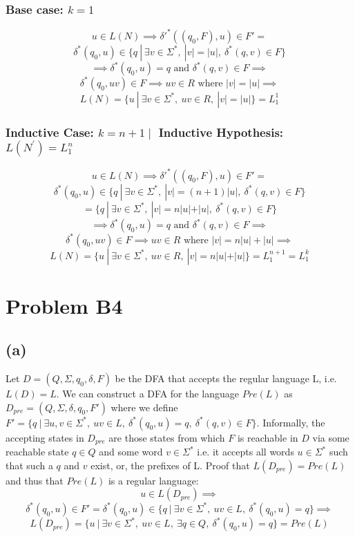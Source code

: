 \documentclass[12pt]{article}
\begin{document}
 \subsubsection*{ Base case: $k=1$}
  $$ u \in L(N) \implies \delta{'}^*((q_0, F), u) \in F' = $$
  $$ \delta^*(q_0, u) \in \{q \:|\: \exists v \in \Sigma^* ,\:
  |v| = |u| ,\: \delta^*(q,v) \in F\}$$
  $$\implies \delta^*(q_0, u) = q \text{ and } \delta^*(q,v) \in F \implies$$
  $$\delta^*(q_0, uv) \in F \implies uv \in R \text{ where }|v|= |u| \implies$$
  $$L(N)=\{u \:|\: \exists v \in \Sigma^* ,\: uv \in R ,\: |v| = |u|\}=L_1^1$$
  \subsubsection*{Inductive Case: $k=n+1 \mid $ Inductive Hypothesis: $L(N^{'}) = L_1^n$}
$$ u \in L(N) \implies \delta{'}^*((q_0, F), u) \in F' = $$
$$ \delta^*(q_0, u) \in \{q \:|\: \exists v \in \Sigma^* ,\:
  |v| = (n+1)|u|,\: \delta^*(q,v) \in F\}$$
  $$= \{q \:|\: \exists v \in \Sigma^* ,\:
  |v| = n|u| + |u|,\: \delta^*(q,v) \in F\}$$
  $$\implies \delta^*(q_0, u) = q \text{ and } \delta^*(q,v) \in F \implies$$
  $$\delta^*(q_0, uv) \in F \implies uv \in R \text{ where }|v|= n|u| + |u| \implies$$
  $$L(N)=\{u \:|\: \exists v \in \Sigma^* ,\: uv \in R ,\: |v| = n|u| + |u|\}=L_1^{n+1}=L_1^k$$
\section*{Problem B4}
\subsection*{(a)}
  Let $D = (Q, \Sigma, q_0, \delta, F)$ be the DFA that accepts the regular
  language L, i.e. $L(D) = L$. We can construct a DFA for the language
  $Pre(L)$ as $D_{pre} = (Q, \Sigma, \delta, q_0, F')$ where we define
  $F' = \{q \:|\: \exists u,v \in \Sigma^* ,\: uv \in L
  ,\: \delta^* (q_0, u) = q ,\: \delta^* (q, v) \in F\}$.
  Informally, the accepting states in $D_{pre}$ are those states from which
  $F$ is reachable in $D$ via some reachable state $q \in Q$ and some
  word $v \in \Sigma^*$ i.e. it accepts all words $u \in \Sigma^*$
  such that such a $q$ and $v$ exist, or, the prefixes of L.
  Proof that $L(D_{pre}) = Pre(L)$ and thus that $Pre(L)$ is a regular language:
  $$u \in L(D_{pre}) \implies$$ $$\delta^*(q_0, u) \in F' =
  \delta^*(q_0, u) \in \{q \:|\: \exists v \in \Sigma^* ,\: uv \in L
  ,\: \delta^*(q_0, u) = q\} \implies$$
  $$L(D_{pre}) = \{u \:|\: \exists v \in \Sigma^* ,\: uv \in L ,\:
  \exists q \in Q ,\: \delta^*(q_0, u) = q \}
  = Pre(L)$$
 
\end{document}
